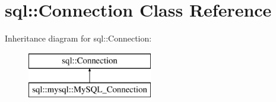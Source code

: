 \hypertarget{classsql_1_1_connection}{}\section{sql\+:\+:Connection Class Reference}
\label{classsql_1_1_connection}
Inheritance diagram for sql\+:\+:Connection\+:\begin{figure}[H]
\begin{center}
\leavevmode
\includegraphics[height=2.000000cm]{classsql_1_1_connection}
\end{center}
\end{figure}
